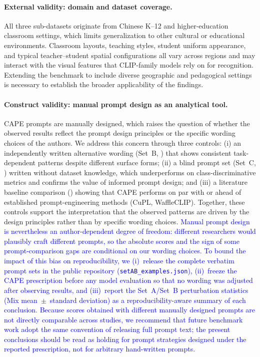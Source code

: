 \documentclass[symmetry,article,submit,pdftex,moreauthors]{Definitions/mdpi}
\newcommand{\rev}[1]{\textcolor{blue}{#1}}
\begin{document}
\paragraph{External validity: domain and dataset coverage.}
All three sub-datasets originate from Chinese K--12 and higher-education classroom settings, which limits generalization to other cultural or educational environments. Classroom layouts, teaching styles, student uniform appearance, and typical teacher--student spatial configurations all vary across regions and may interact with the visual features that CLIP-family models rely on for recognition. Extending the benchmark to include diverse geographic and pedagogical settings is necessary to establish the broader applicability of the findings.

\paragraph{Construct validity: manual prompt design as an analytical tool.}
CAPE prompts are manually designed, which raises the question of whether the observed results reflect the prompt design principles or the specific wording choices of the authors. We address this concern through three controls: (i) an independently written alternative wording (Set~B, ) that shows consistent task-dependent patterns despite different surface forms; (ii) a blind prompt set (Set~C, ) written without dataset knowledge, which underperforms on class-discriminative metrics and confirms the value of informed prompt design; and (iii) a literature baseline comparison () showing that CAPE performs on par with or ahead of established prompt-engineering methods (CuPL, WaffleCLIP). Together, these controls support the interpretation that the observed patterns are driven by the design principles rather than by specific wording choices. \rev{Manual prompt design is nevertheless an author-dependent degree of freedom: different researchers would plausibly craft different prompts, so the absolute scores and the sign of some prompt-comparison gaps are conditional on our wording choices. To bound the impact of this bias on reproducibility, we (i)~release the complete verbatim prompt sets in the public repository (\texttt{setAB\_examples.json}), (ii)~freeze the CAPE prescription before any model evaluation so that no wording was adjusted after observing results, and (iii)~report the Set~A/Set~B perturbation statistics (Mix mean~$\pm$~standard deviation) as a reproducibility-aware summary of each conclusion. Because scores obtained with different manually designed prompts are not directly comparable across studies, we recommend that future benchmark work adopt the same convention of releasing full prompt text; the present conclusions should be read as holding for prompt strategies designed under the reported prescription, not for arbitrary hand-written prompts.}
\end{document}
